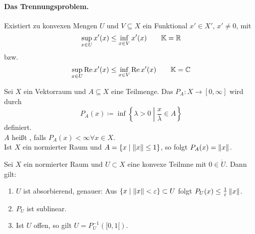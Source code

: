 \paragraph{Das Trennungsproblem.} Existiert zu konvexen Mengen $ U $ und $ V\subseteq X $ ein Funktional $ x'\in X' $, $ x'\neq 0 $, mit
\[ \sup_{x\in U}x'(x)\leq\inf_{x\in V}x'(x)\qquad\mathbb{K}=\mathbb{R} \]
bzw.
\[ \sup_{x\in U}\operatorname{Re} x'(x)\leq\inf_{x\in V}\operatorname{Re} x'(x)\qquad \mathbb{K}=\mathbb{C} \]
\begin{definition}
	Sei $ X $ ein Vektorraum und $ A\subseteq X $ eine Teilmenge. Das  $ P_A\colon X\rightarrow[0,\infty] $ wird durch
	\[ P_A(x)\coloneqq\inf\left\lbrace\lambda>0\middle|\frac{x}{\lambda}\in A\right\rbrace \]
	definiert.\\
	$ A $ hei\ss t , falls $ P_A(x)<\infty\forall x\in X $.\\
	Ist $ X $ ein normierter Raum und $ A=\lbrace x\mid\left\|x\right\|\leq 1\rbrace $, so folgt $ P_A(x)=\left\|x\right\| $.
\end{definition}
\begin{lemma}
	Sei $ X $ ein normierter Raum und $ U\subset X $ eine konvexe Teilmne mit $ 0\in\mathring U $. Dann gilt:
	\begin{enumerate}
		\item $ U $ ist absorbierend, genauer: Aus $ \lbrace x\mid\left\|x\right\|<\varepsilon\rbrace\subset U $ folgt $ P_U(x)\leq\frac{1}{\varepsilon}\left\|x\right\| $.
		\item $ P_U $ ist sublinear.
		\item Ist $ U $ offen, so gilt $ U=P_U^{-1}([0,1[) $.
	\end{enumerate}
\end{lemma}
